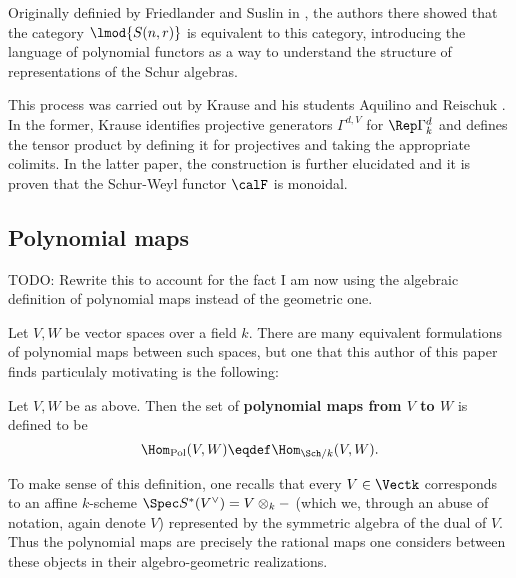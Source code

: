 \documentclass[12pt]{article}
\begin{document}
Originally definied by Friedlander and Suslin in \cite{friedlander-suslin}, the authors there showed that 
the category $\lmod{S(n,r)}$ is equivalent to this category, introducing the language of polynomial functors as 
a way to understand the structure of representations of the Schur algebras. 

This process was carried out by Krause \cite{krause-strict-poly-func} and his students Aquilino and Reischuk \cite{aquilino-reischuk}.
In the former, Krause identifies projective generators $\Gamma^{d,V}$ for $\Rep\Gamma^d_k$ and defines the tensor product 
by defining it for projectives and taking the appropriate colimits. In the latter paper, the construction 
is further elucidated and it is proven that the Schur-Weyl functor $\calF$ is monoidal.

\subsection{Polynomial maps}
{\color{red} TODO: Rewrite this to account for the fact I am now using the algebraic definition of polynomial maps instead of the geometric one.}

Let $V,W$ be vector spaces over a field $k$. There are many equivalent formulations of polynomial maps between such spaces, 
but one that this author of this paper finds particulaly motivating is the following:
\begin{defn}\label{defn:poly-maps}
	Let $V,W$ be as above. Then the set of \textbf{polynomial maps from $V$ to $W$} is defined to be 
	\[\Hom_\text{Pol}(V,W)\eqdef \Hom_{\Sch/k}(V,W).\]
\end{defn}

To make sense of this definition, one recalls that every $V\in\Vectk$ corresponds to an affine $k$-scheme 
$\Spec S^\ast(V^\vee)=V\otimes_k-$ (which we, through an abuse of notation, again denote $V$) represented by the symmetric algebra of the dual of $V$. Thus the polynomial maps
are precisely the rational maps one considers between these objects in their algebro-geometric realizations.
\end{document}

